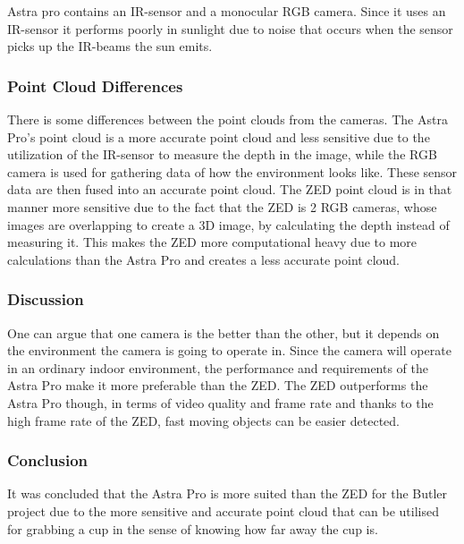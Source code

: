 Astra pro contains an IR-sensor and a monocular RGB camera. Since it uses an IR-sensor it performs poorly in sunlight due to noise that occurs when the sensor picks up the IR-beams the sun emits.
 
\subsubsection{Point Cloud Differences}
 
There is some differences between the point clouds from the cameras. The Astra Pro's point cloud is a more accurate point cloud and less sensitive due to the utilization of the IR-sensor to measure the depth in the image, while the RGB camera is used for gathering data of how the environment looks like. These sensor data are then fused into an accurate point cloud. The ZED point cloud
is in that manner more sensitive due to the fact that the ZED is 2 RGB cameras, whose images are overlapping to create a 3D image, by calculating the depth instead of measuring it. This makes the ZED more computational heavy due to more calculations than the Astra Pro and creates a less accurate point cloud.


\subsubsection{Discussion}
One can argue that one camera is the better than the other, but it depends on the environment the camera is going to operate in. Since the camera will operate in an ordinary indoor environment, the performance and requirements of the Astra Pro make it more preferable than the ZED. The ZED outperforms the Astra Pro though, in terms of video quality and frame rate and thanks to the high frame rate of the ZED, fast moving objects can be easier detected.

 
\subsubsection{Conclusion} 
It was concluded that the Astra Pro is more suited than the ZED for the Butler project due to the more sensitive and accurate point cloud that can be utilised for grabbing a cup in the sense of knowing how far away the cup is.  
 



